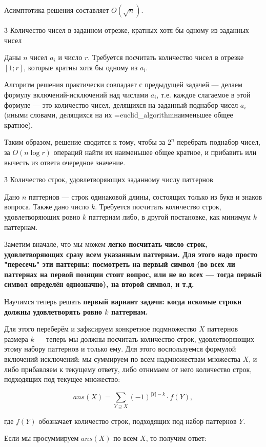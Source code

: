 Асимптотика решения составляет $O (\sqrt{n})$.


\h3{ Количество чисел в заданном отрезке, кратных хотя бы одному из заданных чисел }

Даны $n$ чисел $a_i$ и число $r$. Требуется посчитать количество чисел в отрезке $[1; r]$, которые кратны хотя бы одному из $a_i$.

Алгоритм решения практически совпадает с предыдущей задачей --- делаем формулу включений-исключений над числами $a_i$, т.е. каждое слагаемое в этой формуле --- это количество чисел, делящихся на заданный поднабор чисел $a_i$ (иными словами, делящихся на их \algohref=euclid_algorithm{наименьшее общее кратное}).

Таким образом, решение сводится к тому, чтобы за $2^n$ перебрать поднабор чисел, за $O(n \log r)$ операций найти их наименьшее общее кратное, и прибавить или вычесть из ответа очередное значение.


\h3{ Количество строк, удовлетворяющих заданному числу паттернов }

Дано $n$ паттернов --- строк одинаковой длины, состоящих только из букв и знаков вопроса. Также дано число $k$. Требуется посчитать количество строк, удовлетворяющих ровно $k$ паттернам либо, в другой постановке, как минимум $k$ паттернам.

Заметим вначале, что мы можем \bf{легко посчитать число строк}, удовлетворяющих сразу всем указанным паттернам. Для этого надо просто "пересечь" эти паттерны: посмотреть на первый символ (во всех ли паттернах на первой позиции стоит вопрос, или не во всех --- тогда первый символ определён однозначно), на второй символ, и т.д.

Научимся теперь решать \bf{первый вариант задачи}: когда искомые строки должны удовлетворять ровно $k$ паттернам.

Для этого переберём и зафксируем конкретное подмножество $X$ паттернов размера $k$ --- теперь мы должны посчитать количество строк, удовлетворяющих этому набору паттернов и только ему. Для этого воспользуемся формулой включений-исключений: мы суммируем по всем надмножествам множества $X$, и либо прибавляем к текущему ответу, либо отнимаем от него количество строк, подходящих под текущее множество:

$$ ans(X) = \sum_{Y \supseteq X} (-1)^{|Y|-k} \cdot f(Y), $$

где $f(Y)$ обозначает количество строк, подходящих под набор паттернов $Y$.

Если мы просуммируем $ans(X)$ по всем $X$, то получим ответ:

